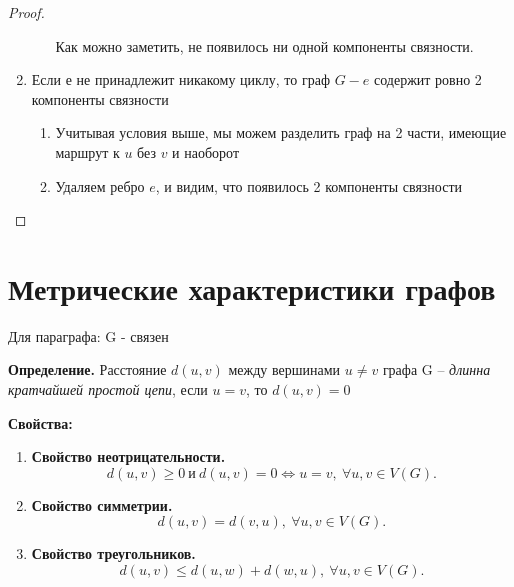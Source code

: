 \documentclass[a4paper, 12pt]{article}
\theoremstyle{definition}
\renewcommand{\leq}{\leqslant}
\renewcommand{\geq}{\geqslant}
\begin{document}
\begin{proof}
\begin{enumerate}
\begin{enumerate}
        Как можно заметить, не появилось ни одной компоненты связности.
      \end{enumerate}
      \item Если $е$ не принадлежит никакому циклу, то граф $G - e$ содержит ровно 2 компоненты связности
      \begin{enumerate}
        \item Учитывая условия выше, мы можем разделить граф на 2 части, имеющие маршрут к $u$ без $v$ и наоборот
        
        \item Удаляем ребро $e$, и видим, что появилось 2 компоненты связности
        
      \end{enumerate}
    \end{enumerate}
  \end{proof}
  
  \section{Метрические характеристики графов}
  Для параграфа: G - связен

  \textbf{Определение.} Расстояние $d(u,v)$ между вершинами $u\neq v$ графа G --  \textit{длинна кратчайшей простой цепи}, если $u=v$, то $d(u,v)=0$
  
  \textbf{Свойства:}
  \begin{enumerate}
    \item \textbf{Свойство неотрицательности.}
    $$d(u,v)\geq 0\ \text{и}\ d(u,v) = 0 \Leftrightarrow u=v,\ \forall u,v\in V(G).$$
    \item \textbf{Свойство симметрии.} 
    $$d(u,v)=d(v,u),\ \forall u,v\in V(G).$$ 
    \item \textbf{Свойство треугольников.}
    $$d(u,v)\leq d(u,w)+d(w,u),\ \forall u,v\in V(G).$$
  \end{enumerate}
  
\end{document}
